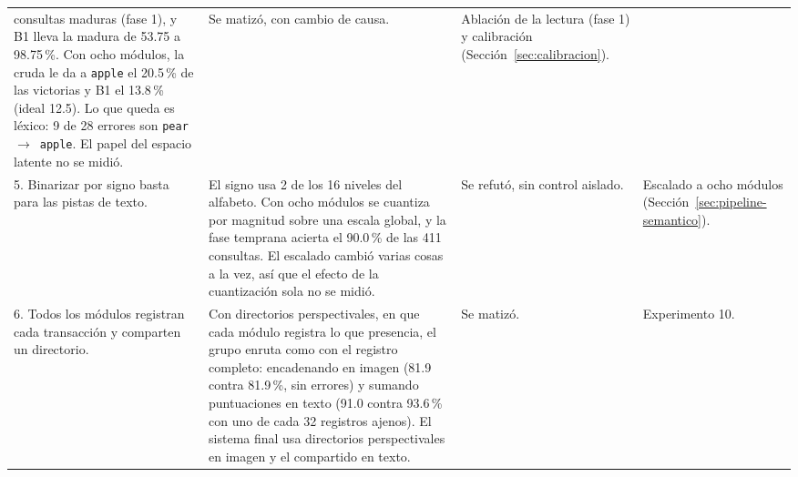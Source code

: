\begin{table}[H]
\begin{tabular}{p{}p{}p{}p{}}
        consultas maduras (fase 1), y B1 lleva la madura de 53.75 a 98.75\,\%. Con ocho
        módulos, la cruda le da a \texttt{apple} el 20.5\,\% de las victorias y B1 el
        13.8\,\% (ideal 12.5). Lo que queda es léxico: 9 de 28 errores son
        \texttt{pear}~$\to$~\texttt{apple}. El papel del espacio latente no se midió. &
        \raggedright Se matizó, con cambio de causa. &
        \raggedright Ablación de la lectura (fase 1) y calibración
        (Sección~\ref{sec:calibracion}). \tabularnewline\addlinespace[4pt]
        \raggedright 5. Binarizar por signo basta para las pistas de texto. &
        \raggedright El signo usa 2 de los 16 niveles del alfabeto. Con ocho módulos se
        cuantiza por magnitud sobre una escala global, y la fase temprana acierta el
        90.0\,\% de las 411 consultas. El escalado cambió varias cosas a la vez, así que
        el efecto de la cuantización sola no se midió. &
        \raggedright Se refutó, sin control aislado. &
        \raggedright Escalado a ocho módulos (Sección~\ref{sec:pipeline-semantico}).
        \tabularnewline\addlinespace[4pt]
        \raggedright 6. Todos los módulos registran cada transacción y comparten un
        directorio. &
        \raggedright Con directorios perspectivales, en que cada módulo registra lo que
        presencia, el grupo enruta como con el registro completo: encadenando en imagen
        (81.9 contra 81.9\,\%, sin errores) y sumando puntuaciones en texto (91.0 contra
        93.6\,\% con uno de cada 32 registros ajenos). El sistema final usa directorios
        perspectivales en imagen y el compartido en texto. &
        \raggedright Se matizó. &
        \raggedright Experimento 10. \tabularnewline
        \bottomrule
    \end{tabular}
\end{table}

